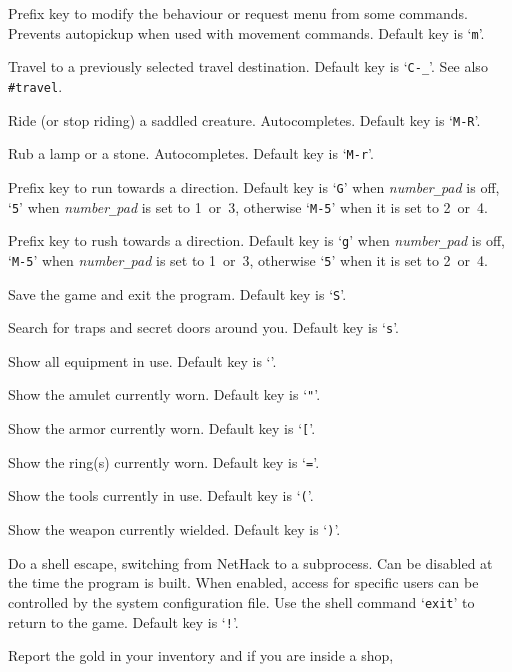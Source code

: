 Prefix key to modify the behaviour or request menu from some commands.
Prevents autopickup when used with movement commands.
Default key is `{\tt m}'.
\item[\tb{\#retravel}]
Travel to a previously selected travel destination.
Default key is `{\tt C-_}'.
See also {\tt \#travel}.
\item[\tb{\#ride}]
Ride (or stop riding) a saddled creature. Autocompletes.
Default key is `{\tt M-R}'.
\item[\tb{\#rub}]
Rub a lamp or a stone. Autocompletes. Default key is `{\tt M-r}'.
\item[\tb{\#run}]
Prefix key to run towards a direction.
Default key is `{\tt G}' when
{\it number\verb+_+pad\/}
is off,
`{\tt 5}' when
{\it number\verb+_+pad\/}
is set to 1~or~3,
otherwise `{\tt M-5}' when it is set to 2~or~4.
\item[\tb{\#rush}]
Prefix key to rush towards a direction.
Default key is `{\tt g}' when
{\it number\verb+_+pad\/}
is off,
`{\tt M-5}' when
{\it number\verb+_+pad\/}
is set to 1~or~3,
otherwise `{\tt 5}' when it is set to 2~or~4.
\item[\tb{\#save}]
Save the game and exit the program.
Default key is `{\tt S}'.
\item[\tb{\#search}]
Search for traps and secret doors around you. Default key is `{\tt s}'.
\item[\tb{\#seeall}]
Show all equipment in use. Default key is `{\tt *}'.
\item[\tb{\#seeamulet}]
Show the amulet currently worn. Default key is `{\tt "}'.
\item[\tb{\#seearmor}]
Show the armor currently worn. Default key is `{\tt [}'.
\item[\tb{\#seerings}]
Show the ring(s) currently worn. Default key is `{\tt =}'.
\item[\tb{\#seetools}]
Show the tools currently in use. Default key is `{\tt (}'.
\item[\tb{\#seeweapon}]
Show the weapon currently wielded. Default key is `{\tt )}'.
\item[\tb{\#shell}]
Do a shell escape, switching from NetHack to a subprocess.
Can be disabled at the time the program is built.
When enabled, access for specific users can be controlled by the system
configuration file.
Use the shell command `{\tt exit}' to return to the game.
Default key is `{\tt !}'.
\item[\tb{\#showgold}]
Report the gold in your inventory and if you are inside a shop,
